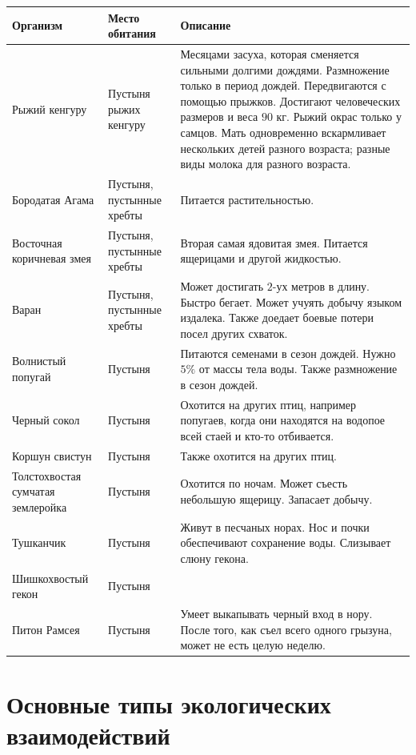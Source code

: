 \documentclass[12pt]{article}
\begin{document}
	\begin{xltabular}{\textwidth}{|X|X|X|}
		\hline
		\textbf{Организм} & \textbf{Место обитания} & \textbf{Описание}\\
		\hline
		Рыжий кенгуру & Пустыня рыжих кенгуру & Месяцами засуха, которая сменяется сильными долгими дождями. Размножение только в период дождей. Передвигаются с помощью прыжков. Достигают человеческих размеров и веса $90$ кг. Рыжий окрас только у самцов. Мать одновременно вскармливает нескольких детей разного возраста; разные виды молока для разного возраста.\\
		\hline
		Бородатая Агама & Пустыня, пустынные хребты & Питается растительностью.\\
		\hline
		Восточная коричневая змея & Пустыня, пустынные хребты & Вторая самая ядовитая змея. Питается ящерицами и другой жидкостью. \\
		\hline
		Варан & Пустыня, пустынные хребты & Может достигать $2$-ух метров в длину. Быстро бегает. Может учуять добычу языком издалека. Также доедает боевые потери посел других схваток.\\
		\hline
		Волнистый попугай & Пустыня & Питаются семенами в сезон дождей. Нужно $5\%$ от массы тела воды. Также размножение в сезон дождей.\\
		\hline
		Черный сокол & Пустыня & Охотится на других птиц, например попугаев, когда они находятся на водопое всей стаей и кто-то отбивается.\\
		\hline
		Коршун свистун & Пустыня & Также охотится на других птиц.\\
		\hline
		Толстохвостая сумчатая землеройка & Пустыня & Охотится по ночам. Может съесть небольшую ящерицу. Запасает добычу.\\
		\hline
		Тушканчик & Пустыня & Живут в песчаных норах. Нос и почки обеспечивают сохранение воды. Слизывает слюну гекона.\\
		\hline
		Шишкохвостый гекон & Пустыня & \\
		\hline
		Питон Рамсея & Пустыня & Умеет выкапывать черный вход в нору. После того, как съел всего одного грызуна, может не есть целую неделю.\\
		\hline
	\end{xltabular}
	
	\section{Основные типы экологических взаимодействий}
	
\end{document}
